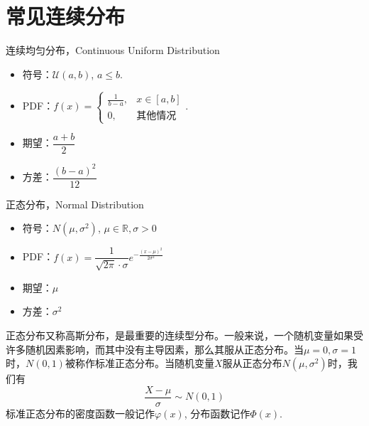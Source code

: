 
\section{常见连续分布}


\begin{frame}

\begin{block}{连续均匀分布，Continuous Uniform Distribution}
\begin{itemize}
\item 符号：$\mathcal{U}(a,b)$, \; $a \le b$.
\item PDF：$f(x) = \begin{cases}
\frac{1}{b-a}, & x\in[a,b] \\
0, & \text{其他情况}
\end{cases}$.
\item 期望：$\dfrac{a+b}{2}$
\item 方差：$\dfrac{(b-a)^2}{12}$
\end{itemize}
\end{block}

\end{frame}


\begin{frame}

\begin{block}{正态分布，Normal Distribution}
\begin{itemize}
\item 符号：$N(\mu, \sigma^2)$, \; $\mu\in\mathbb{R}, \sigma>0$
\item PDF：$f(x) = \dfrac{1}{\sqrt{2\pi}\cdot\sigma} e^{-\frac{(x-\mu)^2}{2\sigma^2}}$
\item 期望：$\mu$
\item 方差：$\sigma^2$
\end{itemize}

\pause

正态分布又称高斯分布，是最重要的连续型分布。一般来说，一个随机变量如果受许多随机因素影响，而其中没有主导因素，那么其服从正态分布。当$\mu = 0, \sigma = 1$时，$N(0, 1)$被称作标准正态分布。当随机变量$X$服从正态分布$N(\mu, \sigma^2)$时，我们有
\[\dfrac{X-\mu}{\sigma} \sim N(0, 1)\]
标准正态分布的密度函数一般记作$\varphi(x)$, 分布函数记作$\Phi(x)$.
\end{block}

\end{frame}

